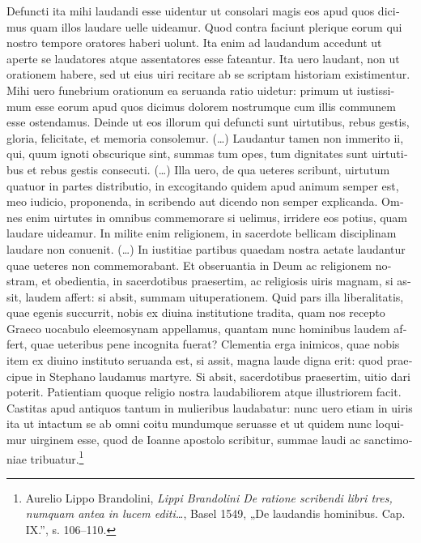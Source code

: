 \documentclass[a5paper,twoside]{article}
\renewenvironment{quote}
               {\list{}{\rightmargin 0mm
                \leftmargin 7mm
                \itemindent 0em}%
                \item\relax}
               {\endlist}
\begin{document}
\begin{quote}
\begin{latin}
Defuncti ita mihi laudandi esse uidentur ut consolari magis eos apud quos dicimus quam illos laudare uelle uideamur. Quod contra faciunt plerique eorum qui nostro tempore oratores haberi uolunt. Ita enim ad laudandum accedunt ut aperte se laudatores atque assentatores esse fateantur. Ita uero laudant, non ut orationem habere, sed ut eius uiri recitare ab se scriptam historiam existimentur. Mihi uero funebrium orationum ea seruanda ratio uidetur: primum ut iustissimum esse eorum apud quos dicimus dolorem nostrumque cum illis communem esse ostendamus. Deinde ut eos illorum qui defuncti sunt uirtutibus, rebus gestis, gloria, felicitate, et memoria consolemur. (\dots) Laudantur tamen non immerito ii, qui, quum ignoti obscurique sint, summas tum opes, tum dignitates sunt uirtutibus et rebus gestis consecuti. (\dots) Illa uero, de qua ueteres scribunt, uirtutum quatuor in partes distributio, in excogitando quidem apud animum semper est, meo iudicio, proponenda, in scribendo aut dicendo non semper explicanda. Omnes enim uirtutes in omnibus commemorare si uelimus, irridere eos potius, quam laudare uideamur. In milite enim religionem, in sacerdote bellicam disciplinam laudare non conuenit. (\dots) In iustitiae partibus quaedam nostra aetate laudantur quae ueteres non commemorabant. Et obseruantia in Deum ac religionem nostram, et obedientia, in sacerdotibus praesertim, ac religiosis uiris magnam, si assit, laudem affert: si absit, summam uituperationem. Quid pars illa liberalitatis, quae egenis succurrit, nobis ex diuina institutione tradita, quam nos recepto Graeco uocabulo eleemosynam appellamus, quantam nunc hominibus laudem affert, quae ueteribus pene incognita fuerat? Clementia erga inimicos, quae nobis item ex diuino instituto seruanda est, si assit, magna laude digna erit: quod praecipue in Stephano laudamus martyre. Si absit, sacerdotibus praesertim, uitio dari poterit. Patientiam quoque religio nostra laudabiliorem atque illustriorem facit. Castitas apud antiquos tantum in mulieribus laudabatur: nunc uero etiam in uiris ita ut intactum se ab omni coitu mundumque seruasse et ut quidem nunc loquimur uirginem esse, quod de Ioanne apostolo scribitur, summae laudi ac sanctimoniae tribuatur.\footnote{Aurelio Lippo Brandolini, \textit{Lippi Brandolini De ratione scribendi libri tres, numquam antea in lucem editi\dots}, Basel 1549, „De laudandis hominibus. Cap. IX.”, s. 106–110.}
\end{latin}


\end{quote}
\end{document}
